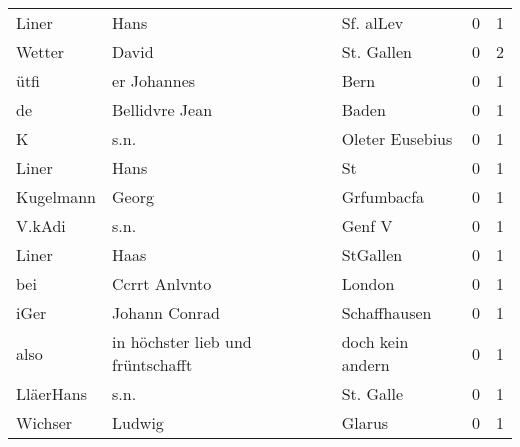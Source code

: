 \begin{tabular}{llllrr}
                    Liner &                               Hans &             &                                   Sf. alLev &          0 &         1 \\
                   Wetter &                              David &             &                                  St. Gallen &          0 &         2 \\
                     ütfi &                        er Johannes &             &                                        Bern &          0 &         1 \\
                       de &                     Bellidvre Jean &             &                                       Baden &          0 &         1 \\
                        K &                               s.n. &             &                             Oleter Eusebius &          0 &         1 \\
                    Liner &                               Hans &             &                                          St &          0 &         1 \\
                Kugelmann &                              Georg &             &                                  Grfumbacfa &          0 &         1 \\
                   V.kAdi &                               s.n. &             &                                      Genf V &          0 &         1 \\
                    Liner &                               Haas &             &                                    StGallen &          0 &         1 \\
                      bei &                      Ccrrt Anlvnto &             &                                      London &          0 &         1 \\
                     iGer &                      Johann Conrad &             &                                Schaffhausen &          0 &         1 \\
                     also &  in höchster lieb und früntschafft &             &                            doch kein andern &          0 &         1 \\
                LläerHans &                               s.n. &             &                                   St. Galle &          0 &         1 \\
                  Wichser &                             Ludwig &             &                                      Glarus &          0 &         1 \\

\end{tabular}
